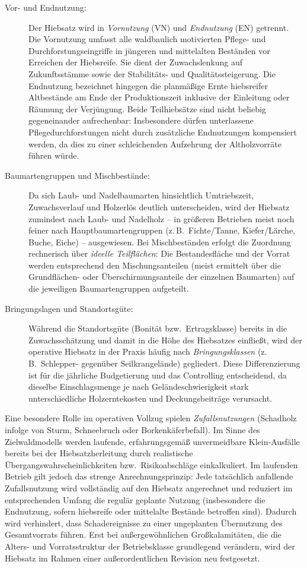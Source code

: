 \documentclass[twocolumn, paper=a4, fontsize=10pt]{scrartcl}
\begin{document}
\begin{description}
\item[Vor- und Endnutzung:] Der Hiebsatz wird in \emph{Vornutzung} (VN) und \emph{Endnutzung} (EN) getrennt. Die Vornutzung umfasst alle waldbaulich motivierten Pflege- und Durchforstungseingriffe in jüngeren und mittelalten Beständen vor Erreichen der Hiebsreife. Sie dient der Zuwachslenkung auf Zukunftsstämme sowie der Stabilitäts- und Qualitätssteigerung. Die Endnutzung bezeichnet hingegen die planmäßige Ernte hiebsreifer Altbestände am Ende der Produktionszeit inklusive der Einleitung oder Räumung der Verjüngung. Beide Teilhiebsätze sind nicht beliebig gegeneinander aufrechenbar: Insbesondere dürfen unterlassene Pflegedurchforstungen nicht durch zusätzliche Endnutzungen kompensiert werden, da dies zu einer schleichenden Aufzehrung der Altholzvorräte führen würde.

\item[Baumartengruppen und Mischbestände:] Da sich Laub- und Nadelbaumarten hinsichtlich Umtriebszeit, Zuwachsverlauf und Holzerlös deutlich unterscheiden, wird der Hiebsatz zumindest nach Laub- und Nadelholz -- in größeren Betrieben meist noch feiner nach Hauptbaumartengruppen (z.\,B.\ Fichte/Tanne, Kiefer/Lärche, Buche, Eiche) -- ausgewiesen. Bei Mischbeständen erfolgt die Zuordnung rechnerisch über \emph{ideelle Teilflächen}: Die Bestandesfläche und der Vorrat werden entsprechend den Mischungsanteilen (meist ermittelt über die Grundflächen- oder Überschirmungsanteile der einzelnen Baumarten) auf die jeweiligen Baumartengruppen aufgeteilt.

\item[Bringungslagen und Standortsgüte:] Während die Standortsgüte (Bonität bzw.\ Ertragsklasse) bereits in die Zuwachsschätzung und damit in die Höhe des Hiebsatzes einfließt, wird der operative Hiebsatz in der Praxis häufig nach \emph{Bringungsklassen} (z.\,B.\ Schlepper- gegenüber Seilkrangelände) gegliedert. Diese Differenzierung ist für die jährliche Budgetierung und das Controlling entscheidend, da dieselbe Einschlagsmenge je nach Geländeschwierigkeit stark unterschiedliche Holzerntekosten und Deckungsbeiträge verursacht.
\end{description}

Eine besondere Rolle im operativen Vollzug spielen \emph{Zufallsnutzungen} (Schadholz infolge von Sturm, Schneebruch oder Borkenkäferbefall). Im Sinne des Zielwaldmodells werden laufende, erfahrungsgemäß unvermeidbare Klein-Ausfälle bereits bei der Hiebsatzherleitung durch realistische Übergangswahrscheinlichkeiten bzw.\ Risikoabschläge einkalkuliert. Im laufenden Betrieb gilt jedoch das strenge Anrechnungsprinzip: Jede tatsächlich anfallende Zufallsnutzung wird vollständig auf den Hiebsatz angerechnet und reduziert im entsprechenden Umfang die regulär geplante Nutzung (insbesondere die Endnutzung, sofern hiebsreife oder mittelalte Bestände betroffen sind). Dadurch wird verhindert, dass Schadereignisse zu einer ungeplanten Übernutzung des Gesamtvorrats führen. Erst bei außergewöhnlichen Großkalamitäten, die die Alters- und Vorratsstruktur der Betriebsklasse grundlegend verändern, wird der Hiebsatz im Rahmen einer außerordentlichen Revision neu festgesetzt.
\end{document}
